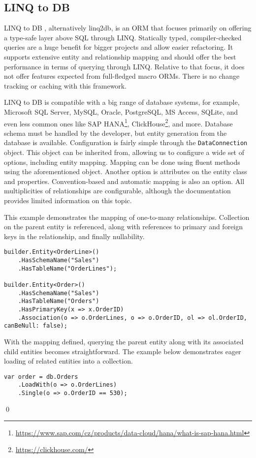 \subsection{LINQ to DB}

LINQ to DB \cite{linq2db, linq2dbRepo}, alternatively linq2db, is an ORM that focuses primarily on offering a type-safe layer above SQL through LINQ. Statically typed, compiler-checked queries are a huge benefit for bigger projects and allow easier refactoring. It supports extensive entity and relationship mapping and should offer the best performance in terms of querying through LINQ. Relative to that focus, it does not offer features expected from full-fledged macro ORMs. There is no change tracking or caching with this framework.

LINQ to DB is compatible with a big range of database systems, for example, Microsoft SQL Server, MySQL, Oracle, PostgreSQL, MS Access, SQLite, and even less common ones like SAP HANA\footnote{\url{https://www.sap.com/cz/products/data-cloud/hana/what-is-sap-hana.html}}, ClickHouse\footnote{\url{https://clickhouse.com/}}, and more. Database schema must be handled by the developer, but entity generation from the database is available. Configuration is fairly simple through the \texttt{DataConnection} object. This object can be inherited from, allowing us to configure a wide set of options, including entity mapping. Mapping can be done using fluent methods using the aforementioned object. Another option is attributes on the entity class and properties. Convention-based and automatic mapping is also an option. All multiplicities of relationships are configurable, although the documentation provides limited information on this topic. 

\begin{example}
\small
This example demonstrates the mapping of one-to-many relationships. Collection on the parent entity is referenced, along with references to primary and foreign keys in the relationship, and finally nullability.

\begin{lstlisting}[language=CSharp]
builder.Entity<OrderLine>()
    .HasSchemaName("Sales")
    .HasTableName("OrderLines");

builder.Entity<Order>()
    .HasSchemaName("Sales")
    .HasTableName("Orders")
    .HasPrimaryKey(x => x.OrderID)
    .Association(o => o.OrderLines, o => o.OrderID, ol => ol.OrderID, canBeNull: false);
\end{lstlisting}

\small With the mapping defined, querying the parent entity along with its associated child entities becomes straightforward. The example below demonstrates eager loading of related entities into a collection.

\begin{lstlisting}[language=CSharp]
var order = db.Orders
    .LoadWith(o => o.OrderLines)
    .Single(o => o.OrderID == 530);
\end{lstlisting}
\qed
\end{example}

